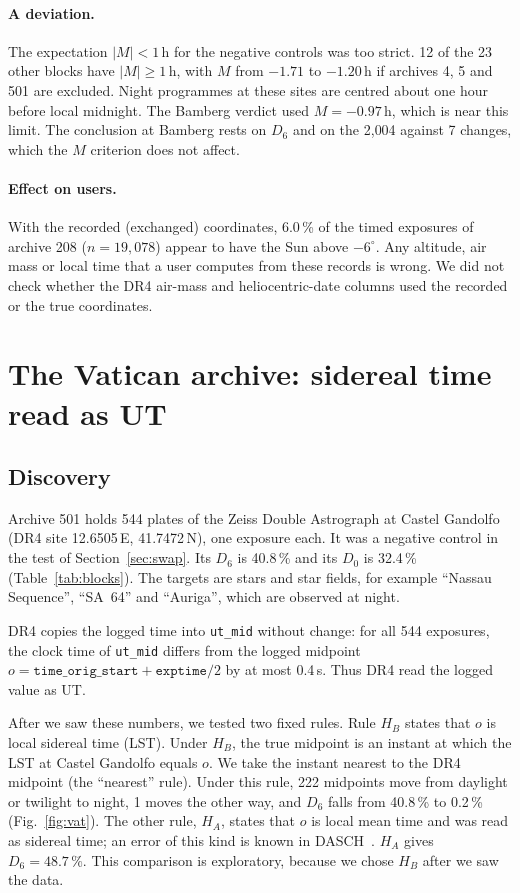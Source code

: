 \documentclass[11pt]{article}
\begin{document}
\paragraph{A deviation.} The expectation $|M|<1$\,h for the negative controls was too strict. 12 of the 23 other blocks have $|M|\ge1$\,h, with $M$ from $-1.71$ to $-1.20$\,h if archives 4, 5 and 501 are excluded. Night programmes at these sites are centred about one hour before local midnight. The Bamberg verdict used $M=-0.97$\,h, which is near this limit. The conclusion at Bamberg rests on $D_6$ and on the 2{,}004 against 7 changes, which the $M$ criterion does not affect.

\paragraph{Effect on users.} With the recorded (exchanged) coordinates, 6.0\,\% of the timed exposures of archive 208 ($n=19{,}078$) appear to have the Sun above $-6^\circ$. Any altitude, air mass or local time that a user computes from these records is wrong. We did not check whether the DR4 air-mass and heliocentric-date columns used the recorded or the true coordinates.

\section{The Vatican archive: sidereal time read as UT}\label{sec:vatican}
\subsection{Discovery}
Archive 501 holds 544 plates of the Zeiss Double Astrograph at Castel Gandolfo (DR4 site 12.6505\,E, 41.7472\,N), one exposure each. It was a negative control in the test of Section~\ref{sec:swap}. Its $D_6$ is 40.8\,\% and its $D_0$ is 32.4\,\% (Table~\ref{tab:blocks}). The targets are stars and star fields, for example ``Nassau Sequence'', ``SA~64'' and ``Auriga'', which are observed at night.

DR4 copies the logged time into \texttt{ut\_mid} without change: for all 544 exposures, the clock time of \texttt{ut\_mid} differs from the logged midpoint $o=\texttt{time\_orig\_start}+\texttt{exptime}/2$ by at most 0.4\,s. Thus DR4 read the logged value as UT.

After we saw these numbers, we tested two fixed rules. Rule $H_B$ states that $o$ is local sidereal time (LST). Under $H_B$, the true midpoint is an instant at which the LST at Castel Gandolfo equals $o$. We take the instant nearest to the DR4 midpoint (the ``nearest'' rule). Under this rule, 222 midpoints move from daylight or twilight to night, 1 moves the other way, and $D_6$ falls from 40.8\,\% to 0.2\,\% (Fig.~\ref{fig:vat}). The other rule, $H_A$, states that $o$ is local mean time and was read as sidereal time; an error of this kind is known in DASCH~\cite{wu2026metcalf}. $H_A$ gives $D_6=48.7\,\%$. This comparison is exploratory, because we chose $H_B$ after we saw the data.
\end{document}
